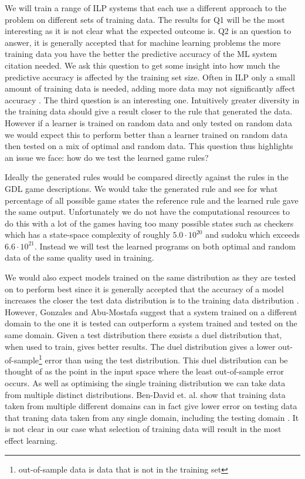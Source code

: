 We will train a range of ILP systems that each use a different approach to the problem on different sets of training data. The results for Q1 will be the most interesting as it is not clear what the expected outcome is. Q2 is an  question to answer, it is generally accepted that for machine learning problems the more training data you have the better the predictive accuracy of the ML system \ac{citation needed}. We ask this question to get some insight into how much the predictive accuracy is affected by the training set size. Often in ILP only a small amount of training data is needed, adding more data may not significantly affect accuracy \cite{Muggleton/ILP}. The third question is an interesting one. Intuitively greater diversity in the training data should give a result closer to the rule that generated the data. However if a learner is trained on random data and only tested on random data we would expect this to perform better than a learner trained on random data then tested on a mix of optimal and random data. This question thus highlights an issue we face: how do we test the learned game rules?

Ideally the generated rules would be compared directly against the rules in the GDL game descriptions. We would take the generated rule and see for what percentage of all possible game states the reference rule and the learned rule gave the same output. Unfortunately we do not have the computational resources to do this with a lot of the games having too many possible states such as checkers which has a state-space complexity of roughly $5.0 \cdot 10^{20}$\cite{Horssen/Checkers} and sudoku which exceeds $6.6 \cdot 10^{21}$\cite{Felgenhauer/Suduko}. Instead we will test the learned programs on both optimal and random data of the same quality used in training. 

We would also expect models trained on the same distribution as they are tested on to perform best since it is generally accepted that the accuracy of a model increases the closer the test data distribution is to the training data distribution \cite{Mitchell/MachineLearing}. However, Gonzales and Abu-Mostafa\cite{Gonzalez/MismatchedOutperform} suggest that a system trained on a different domain to the one it is tested can outperform a system trained and tested on the same domain. Given a test distribution there exsists a duel distribution that, when used to train, gives better results. The duel distribution gives a lower out-of-sample\footnote{out-of-sample data is data that is not in the training set} error than using the test distribution. This duel distribution can be thought of as the point in the input space where the least out-of-sample error occurs\cite{Gonzalez/MismatchedOutperform}. As well as optimising the single training distribution we can take data from multiple distinct distributions. Ben-David et. al. show that training data taken from multiple different domains can in fact give lower error on testing data that traning data taken from any single domain, including the testing domain \cite{Ben-David/DifferentDomains}. It is not clear in our case what selection of training data will result in the most effect learning.

